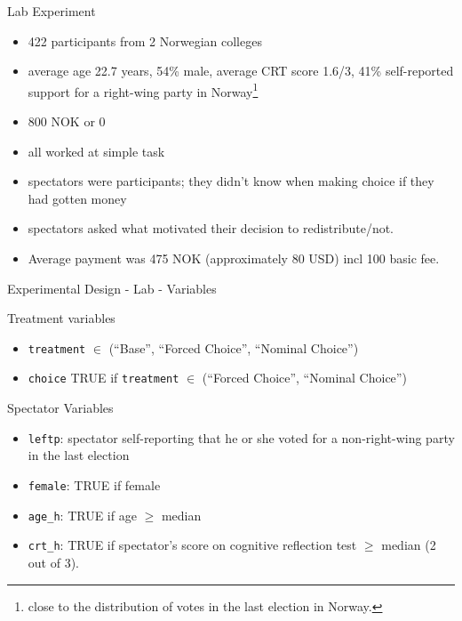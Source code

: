 \documentclass{beamer}
\begin{document}
	\begin{frame}{Lab Experiment}

	\begin{block}

		\begin{itemize}
			\item 422 participants from 2 Norwegian colleges
			\item average age 22.7 years, 54\% male, average CRT score 1.6/3, 41\% self-reported support for a right-wing party in Norway\footnote{close to the distribution of votes in the last election in Norway.}
			\item 800 NOK or 0
			\item all worked at simple task
			\item  spectators were participants; they didn't know when making choice if they had gotten money
			\item spectators asked what motivated their decision to redistribute/not.
			\item Average payment was 475 NOK (approximately 80 USD) incl 100 basic fee.
		\end{itemize}
	\end{block}
\end{frame}
\begin{frame}{Experimental Design - Lab - Variables}
	
	\begin{block}{Treatment variables}\small
		
		\begin{itemize}
			\item \texttt{treatment} $\in$ (``Base'', “Forced Choice”, “Nominal Choice”)
			\item \texttt{choice} TRUE if \texttt{treatment} $\in$ (“Forced Choice”, “Nominal Choice”)
		\end{itemize}
	\end{block}
	
	\begin{block}{Spectator Variables}\small
		\begin{itemize}
			\item \texttt{leftp}: spectator self-reporting that he or she voted for a non-right-wing party in the last election
			\item \texttt{female}: TRUE if female
			\item \texttt{age\_h}: TRUE if age $\ge$ median
			\item \texttt{crt\_h}: TRUE if spectator's score on cognitive reflection test $\ge$ median (2 out of 3).
		\end{itemize}
	\end{block}
	
\end{frame}
\end{document}

